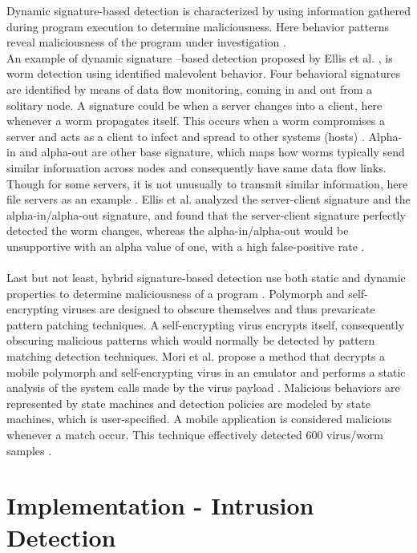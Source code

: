 \documentclass[12pt]{article} %
\begin{document}
Dynamic signature-based detection is characterized by using information gathered during program execution to determine maliciousness. Here behavior patterns reveal maliciousness of the program under investigation \cite{idika2007survey}. \\
An example of dynamic signature –based detection proposed by Ellis et al. \cite{idika2007survey}, is worm detection using identified malevolent behavior. Four behavioral signatures are identified by means of data flow monitoring, coming in and out from a solitary node. A signature could be when a server changes into a client, here whenever a worm propagates itself. This occurs when a worm compromises a server and acts as a client to infect and spread to other systems (hosts) \cite{idika2007survey}. Alpha-in and alpha-out are other base signature, which maps how worms typically send similar information across nodes and consequently have same data flow links. Though for some servers, it is not unusually to transmit similar information, here file servers as an example \cite{idika2007survey}. Ellis et al. \cite{idika2007survey} analyzed the server-client signature and the alpha-in/alpha-out signature, and found that the server-client signature perfectly detected the worm changes, whereas the alpha-in/alpha-out would be unsupportive with an alpha value of one, with a high false-positive rate \cite{idika2007survey}. \\ \\
Last but not least, hybrid signature-based detection use both static and dynamic properties to determine maliciousness of a program \cite{idika2007survey}. Polymorph and self-encrypting viruses are designed to obscure themselves and thus prevaricate pattern patching techniques. A self-encrypting virus encrypts itself, consequently obscuring malicious patterns which would normally be detected by pattern matching detection techniques. Mori et al. \cite{idika2007survey} propose a method that decrypts a mobile polymorph and self-encrypting virus in an emulator and performs a static analysis of the system calls made by the virus payload \cite{idika2007survey}. Malicious behaviors are represented by state machines and detection policies are modeled by state machines, which is user-specified. A mobile application is considered malicious whenever a match occur. This technique effectively detected 600 virus/worm samples \cite{idika2007survey}.
\section{Implementation - Intrusion Detection}
\end{document}
